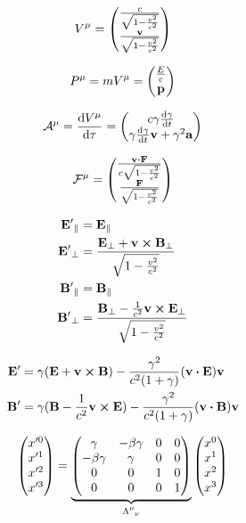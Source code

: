 \documentclass[11pt,twoside]{article}
\begin{document}
\begin{multicols}{3}
\begin{footnotesize}
\begin{equation}
V^{\mu} = \mqty(\frac{c}{\sqrt{1-\frac{v^2}{c^2}}}\\\frac{\vb{v}}{\sqrt{1-\frac{v^2}{c^2}}})
\end{equation}

\begin{equation}
P^{\mu} = mV^{\mu} = \mqty(\frac{E}{c}\\\vb{p})
\end{equation}

\begin{equation}
\mathcal{A}^\mu = \dv{V^{\mu}}{\tau} = \mqty(c\gamma\dv{\gamma}{t}\\\gamma\dv{\gamma}{t}\vb{v}+\gamma^2\vb{a})
\end{equation}

\begin{equation}
\mathcal{F}^\mu = \mqty(\frac{\vb{v}\vdot\vb{F}}{c\sqrt{1-\frac{v^2}{c^2}}}\\\frac{\vb{F}}{\sqrt{1-\frac{v^2}{c^2}}})
\end{equation}

\begin{equation}
\begin{split}
\vb{E'}_{\parallel} &= \vb{E}_{\parallel} \\
\vb{E'}_{\perp} &= \frac{\vb{E}_{\perp}+\vb{v}\cross\vb{B}_{\perp}}{\sqrt{1-\frac{v^2}{c^2}}} \\
\vb{B'}_{\parallel} &= \vb{B}_{\parallel} \\
\vb{B'}_{\perp} &= \frac{\vb{B}_{\perp} - \frac{1}{c^2}\vb{v}\cross\vb{E}_{\perp}}{\sqrt{1-\frac{v^2}{c^2}}}
\end{split}
\end{equation}

\begin{equation}
\begin{split}
\vb{E'} &= \gamma(\vb{E} + \vb{v}\cross\vb{B}) - \frac{\gamma^2}{c^2(1+\gamma)}(\vb{v}\vdot\vb{E})\vb{v} \\
\vb{B'} &= \gamma(\vb{B} - \frac{1}{c^2}\vb{v}\cross\vb{E}) - \frac{\gamma^2}{c^2(1+\gamma)}(\vb{v}\vdot\vb{B})\vb{v}
\end{split}
\end{equation}

\begin{equation}
\mqty(x'^0 \\ x'^1 \\ x'^2 \\ x'^3) = \underbrace{\mqty(\gamma&-\beta\gamma&0&0 \\ -\beta\gamma&\gamma&0&0 \\ 0&0&1&0 \\ 0&0&0&1)}_{\Lambda\indices{^\mu_\nu}}\mqty(x^0 \\ x^1 \\ x^2 \\ x^3)
\end{equation}


\end{footnotesize}
\end{multicols}
\end{document}

